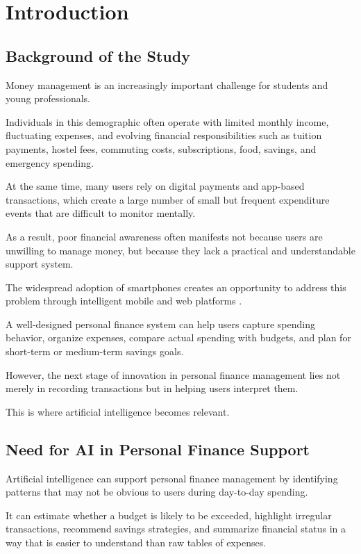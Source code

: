 \documentclass[12pt,a4paper]{report}
\begin{document}
\cleardoublepage
{}

\chapter{Introduction}

\section{Background of the Study}
Money management is an increasingly important challenge for students and young professionals.

Individuals in this demographic often operate with limited monthly income, fluctuating expenses, and evolving financial responsibilities such as tuition payments, hostel fees, commuting costs, subscriptions, food, savings, and emergency spending.

At the same time,
many users rely on digital payments and app-based transactions, which create a large number of small but frequent expenditure events that are difficult to monitor mentally.

As a result,
poor financial awareness often manifests not because users are unwilling to manage money,
but because they lack a practical and understandable support system.

The widespread adoption of smartphones creates an opportunity to address this problem through intelligent mobile and web platforms \cite{ref1,ref2,ref3}.

A well-designed personal finance system can help users capture spending behavior, organize expenses, compare actual spending with budgets, and plan for short-term or medium-term savings goals.

However,
the next stage of innovation in personal finance management lies not merely in recording transactions but in helping users interpret them.

This is where artificial intelligence becomes relevant.

\section{Need for AI in Personal Finance Support}
Artificial intelligence can support personal finance management by identifying patterns that may not be obvious to users during day-to-day spending.

It can estimate whether a budget is likely to be exceeded,
highlight irregular transactions,
recommend savings strategies,
and summarize financial status in a way that is easier to understand than raw tables of expenses.
\end{document}
